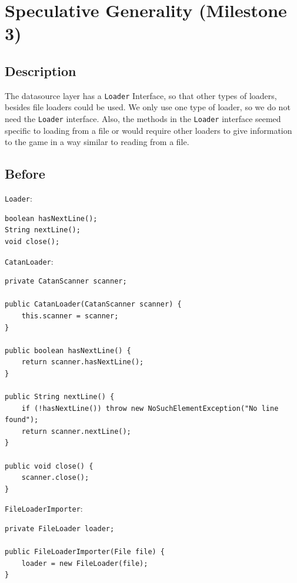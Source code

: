 \documentclass{fank1basedocument}
\begin{document}
\section*{Speculative Generality (Milestone 3)}
\subsection*{Description}
The datasource layer has a \texttt{Loader} Interface, so that other types of loaders, besides ﬁle loaders could be used. We only use one type of loader, so we do not need the \texttt{Loader} interface. Also, the methods in the \texttt{Loader} interface seemed speciﬁc to loading from a ﬁle or would require other loaders to give information to the game in a way similar to reading from a ﬁle.
\subsection*{Before}
\texttt{Loader}:
\begin{lstlisting}[style=javacode,language=myJava]
boolean hasNextLine();
String nextLine();
void close();
\end{lstlisting}
\texttt{CatanLoader}:
\begin{lstlisting}[style=javacode,language=myJava]
private CatanScanner scanner;

public CatanLoader(CatanScanner scanner) {
	this.scanner = scanner;
}

public boolean hasNextLine() {
	return scanner.hasNextLine();
}

public String nextLine() {
	if (!hasNextLine()) throw new NoSuchElementException("No line found");
	return scanner.nextLine();
}

public void close() {
	scanner.close();
}
\end{lstlisting}
\texttt{FileLoaderImporter}:
\begin{lstlisting}[style=javacode,language=myJava]
private FileLoader loader;

public FileLoaderImporter(File file) {
	loader = new FileLoader(file);
}
\end{lstlisting}
\end{document}
